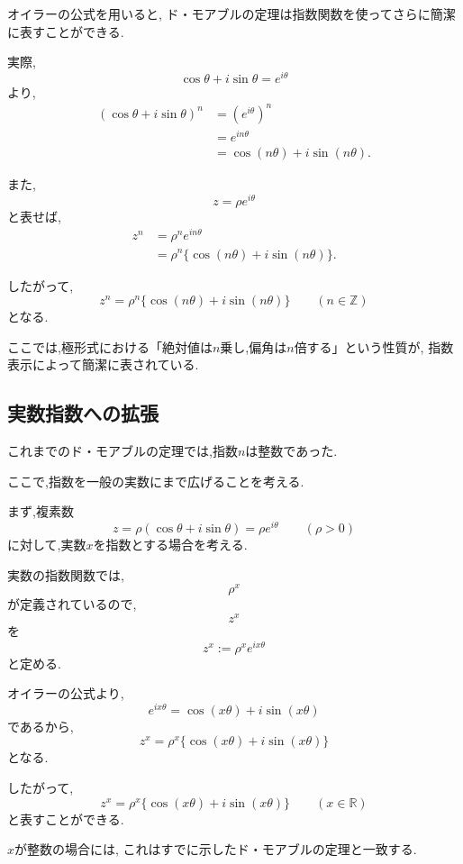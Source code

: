   オイラーの公式を用いると,
  ド・モアブルの定理は指数関数を使ってさらに簡潔に表すことができる.

  実際,
  \[
    \cos\theta+i\sin\theta
    =
    e^{i\theta}
  \]
  より,
  \begin{align*}
    (\cos\theta+i\sin\theta)^n
    &=
    (e^{i\theta})^n\\
    &=
    e^{in\theta}\\
    &=
    \cos(n\theta)+i\sin(n\theta).
  \end{align*}

  また,
  \[
    z
    =
    \rho e^{i\theta}
  \]
  と表せば,
  \begin{align*}
    z^n
    &=
    \rho^n e^{in\theta}\\
    &=
    \rho^n
    \{
      \cos(n\theta)+i\sin(n\theta)
    \}.
  \end{align*}

  したがって,
  \[
    z^n
    =
    \rho^n
    \{
      \cos(n\theta)+i\sin(n\theta)
    \}
    \qquad(n\in\mathbb Z)
  \]
  となる.

  ここでは,極形式における「絶対値は$n$乗し,偏角は$n$倍する」という性質が,
  指数表示によって簡潔に表されている.


\subsection{実数指数への拡張}

  これまでのド・モアブルの定理では,指数$n$は整数であった.

  ここで,指数を一般の実数にまで広げることを考える.

  まず,複素数
  \[
    z
    =
    \rho(
      \cos\theta+i\sin\theta
    )
    =
    \rho e^{i\theta}
    \qquad(\rho>0)
  \]
  に対して,実数$x$を指数とする場合を考える.

  実数の指数関数では,
  \[
    \rho^x
  \]
  が定義されているので,
  \[
    z^x
  \]
  を
  \[
    z^x
    :=
    \rho^x e^{ix\theta}
  \]
  と定める.

  オイラーの公式より,
  \[
    e^{ix\theta}
    =
    \cos(x\theta)+i\sin(x\theta)
  \]
  であるから,
  \[
    z^x
    =
    \rho^x
    \{
      \cos(x\theta)+i\sin(x\theta)
    \}
  \]
  となる.

  したがって,
  \[
    z^x
    =
    \rho^x
    \{
      \cos(x\theta)+i\sin(x\theta)
    \}
    \qquad(x\in\mathbb R)
  \]
  と表すことができる.

  $x$が整数の場合には,
  これはすでに示したド・モアブルの定理と一致する.


